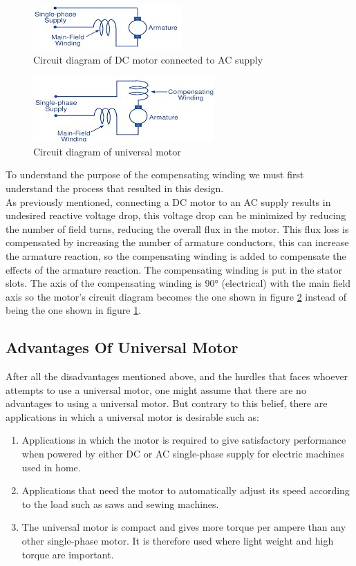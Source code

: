 \documentclass[journal]{IEEEtran}
\begin{document}
\begin{figure}[h]
    \centering
    \includegraphics[scale=1.5]{universal/no_compensating_winding.jpg}
    \caption{Circuit diagram of DC motor connected to AC supply}
    \label{fig:no_comp}
\end{figure}


\begin{figure}[h]
    \centering
    \includegraphics[scale=1.25]{universal/with_compensating_winding.jpg}
    \caption{Circuit diagram of universal motor}
    \label{fig:with_comp}
\end{figure}

To understand the purpose of the compensating winding we must first understand the process that resulted in this design.\\
As previously mentioned, connecting a DC motor to an AC supply results in undesired reactive voltage drop, this voltage drop can be minimized by reducing the number of field turns, reducing the overall flux in the motor. This flux loss is compensated by increasing the number of armature conductors, this can increase the armature reaction, so the compensating winding is added to compensate the effects of the armature reaction. The compensating winding is put in the stator slots. The axis of the compensating winding is 90° (electrical) with the main field axis so the motor's circuit diagram becomes the one shown in figure \ref{fig:with_comp} instead of being the one shown in figure \ref{fig:no_comp}. \cite{guru2007}


\subsection{Advantages Of Universal Motor}
After all the disadvantages mentioned above, and the hurdles that faces whoever attempts to use a universal motor, one might assume that there are no advantages to using a universal motor. But contrary to this belief, there are applications in which a universal motor is desirable such as:
\begin{enumerate}
    \item Applications in which the motor is required to give satisfactory performance when powered by either DC or AC single-phase supply for electric machines used in home. 
    \item Applications that need the motor to automatically adjust its speed according to the load such as saws and sewing machines.
   \item The universal motor is compact and gives more torque per ampere than any other single-phase motor. It is therefore used where light weight and high torque are important. 
    \cite{chapman2005}
\end{enumerate}
\end{document}
